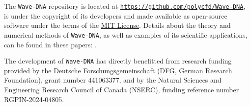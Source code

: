 The {\tt Wave-DNA} repository is located at \href{https://github.com/polycfd/Wave-DNA}{\texttt{https://github.com/polycfd/Wave-DNA}}, is under the copyright of its developers and made available as open-source software under the terms of the \href{https://opensource.org/license/mit/}{MIT License}. Details about the theory and numerical methods of {\tt Wave-DNA}, as well as examples of its scientific applications, can be found in these papers: \citep{Schenke_et_al_2022, Schenke_et_al_2022_PoF, Schenke_et_al_2023_JASA,Denner2024}.

The development of {\tt Wave-DNA} has directly benefitted from research funding provided by the Deutsche Forschungsgemeinschaft (DFG, German Research Foundation), grant number 441063377, and by the Natural Sciences and Engineering Research Council of Canada (NSERC), funding reference number RGPIN-2024-04805.



